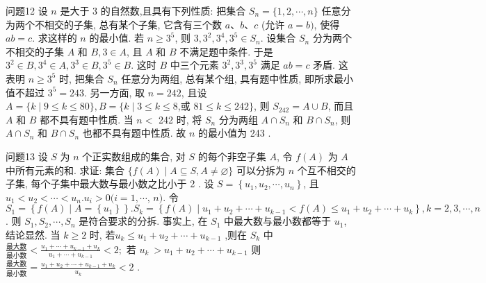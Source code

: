 问题12 设 $n$ 是大于 3 的自然数,且具有下列性质: 把集合 $S_n=\{1,2, \cdots, n\}$ 任意分为两个不相交的子集, 总有某个子集, 它含有三个数 $a 、 b 、 c$ (允许 $a=b)$, 使得 $a b=c$. 求这样的 $n$ 的最小值.
若 $n \geqslant 3^5$, 则 $3,3^2, 3^4, 3^5 \in S_n$. 设集合 $S_n$ 分为两个不相交的子集 $A$ 和 $B, 3 \in A$, 且 $A$ 和 $B$ 不满足题中条件.
于是 $3^2 \in B, 3^4 \in A, 3^3 \in B, 3^5 \in B$. 这时 $B$ 中三个元素 $3^2, 3^3, 3^5$ 满足 $a b=c$ 矛盾.
这表明 $n \geqslant 3^5$ 时, 把集合 $S_n$ 任意分为两组, 总有某个组, 具有题中性质, 即所求最小值不超过 $3^5=243$.
另一方面, 取 $n=242$, 且设 $A=\{k \mid 9 \leqslant k \leqslant 80\}, B=\{k \mid 3 \leqslant k \leqslant 8$,或 $81 \leqslant k \leqslant 242\}$, 则 $S_{242}=A \cup B$, 而且 $A$ 和 $B$ 都不具有题中性质.
当 $n<$ 242 时, 将 $S_n$ 分为两组 $A \cap S_n$ 和 $B \cap S_n$, 则 $A \cap S_n$ 和 $B \cap S_n$ 也都不具有题中性质.
故 $n$ 的最小值为 243 .



问题13 设 $S$ 为 $n$ 个正实数组成的集合, 对 $S$ 的每个非空子集 $A$, 令 $f(A)$ 为 $A$ 中所有元素的和.
求证: 集合 $\{f(A) \mid A \subseteq S, A \neq \varnothing\}$ 可以分拆为 $n$ 个互不相交的子集, 每个子集中最大数与最小数之比小于 2 .
设 $S=\left\{u_1, u_2, \cdots, u_n\right\}$, 且 $u_1<u_2<\cdots<u_n . u_i>0(i=1, \cdots$, $n)$. 令 $S_1=\left\{f(A) \mid A=\left\{u_1\right\}\right\} . S_k=\left\{f(A) \mid u_1+u_2+\cdots+u_{k-1}<f(A) \leqslant u_1+u_2+\cdots+u_k\right\}, k=2,3, \cdots, n$. 则 $S_1, S_2, \cdots, S_n$ 是符合要求的分拆.
事实上, 在 $S_1$ 中最大数与最小数都等于 $u_1$, 结论显然.
当 $k \geqslant 2$ 时, 若$u_{k}\leq u_{1}+u_{2}+\cdots+u_{k-1}$ ,则在 ${S_{k}}$ 中 $\frac{最大数}{最小数}<{\frac{u_{1}+\cdots+u_{k-1}+u_{k}}{u_{1}+\cdots+u_{k-1}}}<2;$ 若 $u_{k}\ >u_{1}+u_{2}+\cdots+u_{k-1}$ 则$\frac{最大数}{最小数}={\frac{u_{1}+u_{2}+\cdots+u_{k-1}+u_{k}}{u_{k}}}<2$ .



